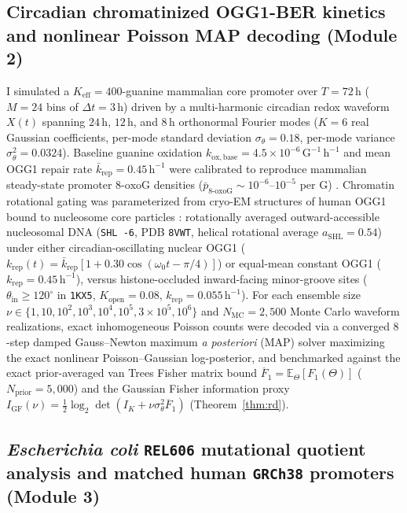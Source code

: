 \documentclass[10pt,letterpaper]{article}
\theoremstyle{plain}
\theoremstyle{definition}
\newcommand{\oxog}{\text{8-oxoG}}
\begin{document}
\subsection*{Circadian chromatinized OGG1-BER kinetics and nonlinear Poisson MAP decoding (Module 2)}

I simulated a $K_{\mathrm{eff}} = 400$-guanine mammalian core promoter over $T = 72\,\mathrm{h}$ ($M = 24$ bins of $\Delta t = 3\,\mathrm{h}$) driven by a multi-harmonic circadian redox waveform $X(t)$ spanning $24\,\mathrm{h}$, $12\,\mathrm{h}$, and $8\,\mathrm{h}$ orthonormal Fourier modes ($K = 6$ real Gaussian coefficients, per-mode standard deviation $\sigma_\theta = 0.18$, per-mode variance $\sigma_\theta^2 = 0.0324$). Baseline guanine oxidation $k_{\mathrm{ox,base}} = 4.5 \times 10^{-6}\,\mathrm{G}^{-1}\,\mathrm{h}^{-1}$ and mean OGG1 repair rate $\bar{k}_{\mathrm{rep}} = 0.45\,\mathrm{h}^{-1}$ were calibrated to reproduce mammalian steady-state promoter $\oxog$ densities ($\bar{p}_{\oxog} \sim 10^{-6}$--$10^{-5}$ per G) \cite{obermann2024redox,li2025nar,wang2025jbiomedsci}. Chromatin rotational gating was parameterized from cryo-EM structures of human OGG1 bound to nucleosome core particles \cite{cordero2024natcommun,ren2024natcommun}: rotationally averaged outward-accessible nucleosomal DNA (\texttt{SHL -6}, PDB \texttt{8VWT}, helical rotational average $a_{\mathrm{SHL}} = 0.54$) under either circadian-oscillating nuclear OGG1 ($k_{\mathrm{rep}}(t) = \bar{k}_{\mathrm{rep}}[1 + 0.30\cos(\omega_0 t - \pi/4)]$) or equal-mean constant OGG1 ($k_{\mathrm{rep}} = 0.45\,\mathrm{h}^{-1}$), versus histone-occluded inward-facing minor-groove sites ($\theta_{\mathrm{in}} \ge 120^\circ$ in \texttt{1KX5}, $K_{\mathrm{open}} = 0.08$, $k_{\mathrm{rep}} = 0.055\,\mathrm{h}^{-1}$). For each ensemble size $\nu \in \{1, 10, 10^2, 10^3, 10^4, 10^5, 3\times 10^5, 10^6\}$ and $N_{\mathrm{MC}} = 2{,}500$ Monte Carlo waveform realizations, exact inhomogeneous Poisson counts were decoded via a converged $8$-step damped Gauss--Newton maximum \emph{a posteriori} (MAP) solver maximizing the exact nonlinear Poisson--Gaussian log-posterior, and benchmarked against the exact prior-averaged van Trees Fisher matrix bound $\overline{F}_1 = \mathbb{E}_\Theta[F_1(\Theta)]$ ($N_{\mathrm{prior}} = 5{,}000$) and the Gaussian Fisher information proxy $I_{\mathrm{GF}}(\nu) = \frac{1}{2}\log_2\det(I_K + \nu\sigma_\theta^2\overline{F}_1)$ (Theorem~\ref{thm:rd}).

\subsection*{\emph{Escherichia coli} \texttt{REL606} mutational quotient analysis and matched human \texttt{GRCh38} promoters (Module 3)}
\end{document}
